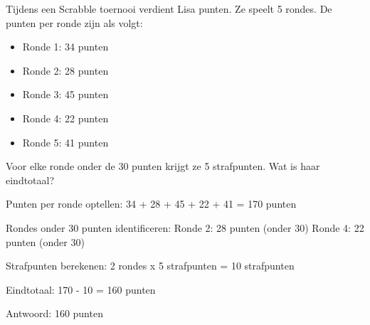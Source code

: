 \begin{opgave}
Tijdens een Scrabble toernooi verdient Lisa punten. Ze speelt 5 rondes. De 
punten per ronde zijn als volgt:
\begin{itemize}
\item Ronde 1: 34 punten
\item Ronde 2: 28 punten  
\item Ronde 3: 45 punten
\item Ronde 4: 22 punten
\item Ronde 5: 41 punten
\end{itemize}
Voor elke ronde onder de 30 punten krijgt ze 5 strafpunten. Wat is haar 
eindtotaal?
\end{opgave}

\begin{oplossing}
Punten per ronde optellen:
34 + 28 + 45 + 22 + 41 = 170 punten

Rondes onder 30 punten identificeren:
Ronde 2: 28 punten (onder 30)
Ronde 4: 22 punten (onder 30)

Strafpunten berekenen:
2 rondes x 5 strafpunten = 10 strafpunten

Eindtotaal:
170 - 10 = 160 punten

Antwoord: 160 punten
\end{oplossing}